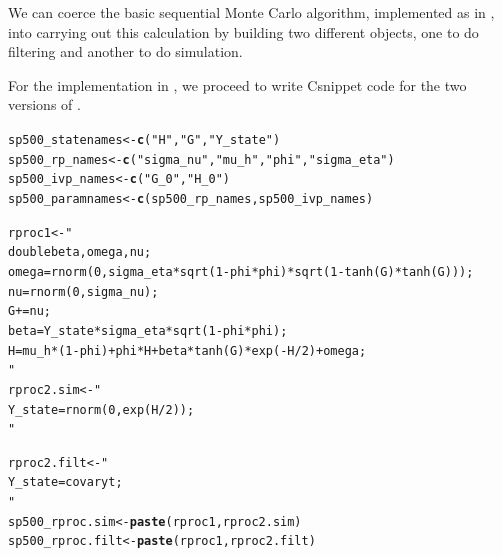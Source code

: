 \documentclass{beamer}\usepackage[]{graphicx}\usepackage[]{color}
\makeatletter
\newcommand{\hlstr}[1]{\textcolor[rgb]{0.192,0.494,0.8}{#1}}%
\newcommand{\hlstd}[1]{\textcolor[rgb]{0.345,0.345,0.345}{#1}}%
\newcommand{\hlkwb}[1]{\textcolor[rgb]{0.69,0.353,0.396}{#1}}%
\newcommand{\hlkwd}[1]{\textcolor[rgb]{0.737,0.353,0.396}{\textbf{#1}}}%
\newenvironment{kframe}{%
 \def\at@end@of@kframe{}%
 \ifinner\ifhmode%
  \def\at@end@of@kframe{\end{minipage}}%
  \begin{minipage}{\columnwidth}%
 \fi\fi%
 \def\FrameCommand##1{\hskip\@totalleftmargin \hskip-\fboxsep
 \colorbox{shadecolor}{##1}\hskip-\fboxsep
     \hskip-\linewidth \hskip-\@totalleftmargin \hskip\columnwidth}%
 \MakeFramed {\advance\hsize-\width
   \@totalleftmargin\z@ \linewidth\hsize
   \@setminipage}}%
 {\par\unskip\endMakeFramed%
 \at@end@of@kframe}
\newenvironment{knitrout}{}{} %
\makeatother
\begin{document}
\begin{frame}[fragile]

\bi

\item We can coerce the basic sequential Monte Carlo algorithm, implemented as  in , into carrying out this calculation by building two different  objects, one to do filtering and another to do simulation.

\item For the implementation in , we proceed to write Csnippet code for the two versions of . 

\ei

\begin{knitrout}\small
{}\color{fgcolor}\begin{kframe}
\begin{alltt}
\hlstd{sp500_statenames} \hlkwb{<-} \hlkwd{c}\hlstd{(}\hlstr{"H"}\hlstd{,}\hlstr{"G"}\hlstd{,}\hlstr{"Y_state"}\hlstd{)}
\hlstd{sp500_rp_names} \hlkwb{<-} \hlkwd{c}\hlstd{(}\hlstr{"sigma_nu"}\hlstd{,}\hlstr{"mu_h"}\hlstd{,}\hlstr{"phi"}\hlstd{,}\hlstr{"sigma_eta"}\hlstd{)}
\hlstd{sp500_ivp_names} \hlkwb{<-} \hlkwd{c}\hlstd{(}\hlstr{"G_0"}\hlstd{,}\hlstr{"H_0"}\hlstd{)}
\hlstd{sp500_paramnames} \hlkwb{<-} \hlkwd{c}\hlstd{(sp500_rp_names,sp500_ivp_names)}
\end{alltt}
\end{kframe}
\end{knitrout}


\end{frame}

\begin{frame}[fragile]

\begin{knitrout}\small
{}\color{fgcolor}\begin{kframe}
\begin{alltt}
\hlstd{rproc1} \hlkwb{<-} \hlstr{"
  double beta,omega,nu;
  omega = rnorm(0,sigma_eta * sqrt( 1- phi*phi ) * sqrt(1-tanh(G)*tanh(G)));
  nu = rnorm(0, sigma_nu);
  G += nu;
  beta = Y_state * sigma_eta * sqrt( 1- phi*phi );
  H = mu_h*(1 - phi) + phi*H + beta * tanh( G ) * exp(-H/2) + omega;
"}
\hlstd{rproc2.sim} \hlkwb{<-} \hlstr{"
  Y_state = rnorm( 0,exp(H/2) );
 "}

\hlstd{rproc2.filt} \hlkwb{<-} \hlstr{"
  Y_state = covaryt;
 "}
\hlstd{sp500_rproc.sim} \hlkwb{<-} \hlkwd{paste}\hlstd{(rproc1,rproc2.sim)}
\hlstd{sp500_rproc.filt} \hlkwb{<-} \hlkwd{paste}\hlstd{(rproc1,rproc2.filt)}
\end{alltt}
\end{kframe}
\end{knitrout}

\end{frame}
\end{document}
